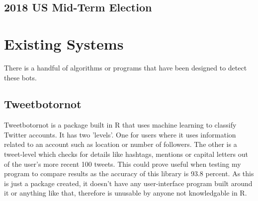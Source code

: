 \subsection{2018 US Mid-Term Election}


\section{Existing Systems}
There is a handful of algorithms or programs that have been designed to detect these bots.


\subsection{Tweetbotornot}
Tweetbotornot is a package built in R that uses machine learning to classify Twitter accounts. It has two 'levels'. One for users where it uses information related to an account such as location or number of followers. The other is a tweet-level which checks for details like hashtags, mentions or capital letters out of the user's more recent 100 tweets. 
This could prove useful when testing my program to compare results as the accuracy of this library is 93.8 percent. As this is just a package created, it doesn't have any user-interface program built around it or anything like that, therefore is unusable by anyone not knowledgable in R. 


